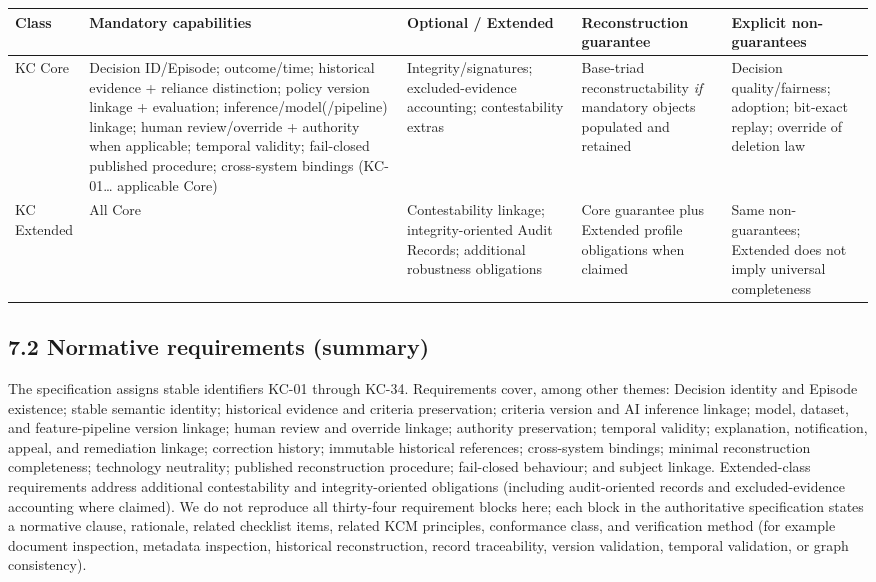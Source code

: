\documentclass[11pt,a4paper]{article}
\begin{document}
\begin{table}[t]
\centering
\small
\begin{tabularx}{\textwidth}{|X|X|X|X|X|}
\hline
 Class & Mandatory capabilities & Optional / Extended & Reconstruction guarantee & Explicit non-guarantees \\
 \hline
 \hline
 KC Core & Decision ID/Episode; outcome/time; historical evidence + reliance distinction; policy version linkage + evaluation; inference/model(/pipeline) linkage; human review/override + authority when applicable; temporal validity; fail-closed published procedure; cross-system bindings (KC-01… applicable Core) & Integrity/signatures; excluded-evidence accounting; contestability extras & Base-triad reconstructability \emph{if} mandatory objects populated and retained & Decision quality/fairness; adoption; bit-exact replay; override of deletion law \\
 \hline
 KC Extended & All Core & Contestability linkage; integrity-oriented Audit Records; additional robustness obligations & Core guarantee plus Extended profile obligations when claimed & Same non-guarantees; Extended does not imply universal completeness \\
 \hline
\end{tabularx}
\end{table}


\subsection{7.2 Normative requirements (summary)}

The specification assigns stable identifiers KC-01 through KC-34. Requirements cover, among other themes: Decision identity and Episode existence; stable semantic identity; historical evidence and criteria preservation; criteria version and AI inference linkage; model, dataset, and feature-pipeline version linkage; human review and override linkage; authority preservation; temporal validity; explanation, notification, appeal, and remediation linkage; correction history; immutable historical references; cross-system bindings; minimal reconstruction completeness; technology neutrality; published reconstruction procedure; fail-closed behaviour; and subject linkage. Extended-class requirements address additional contestability and integrity-oriented obligations (including audit-oriented records and excluded-evidence accounting where claimed). We do not reproduce all thirty-four requirement blocks here; each block in the authoritative specification states a normative clause, rationale, related checklist items, related KCM principles, conformance class, and verification method (for example document inspection, metadata inspection, historical reconstruction, record traceability, version validation, temporal validation, or graph consistency).
\end{document}
